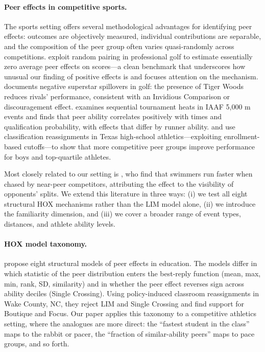 \documentclass[12pt]{article}
\theoremstyle{definition}
\theoremstyle{remark}
\begin{document}
\paragraph{Peer effects in competitive sports.}
The sports setting offers several methodological advantages for identifying peer
effects: outcomes are objectively measured, individual contributions are
separable, and the composition of the peer group often varies quasi-randomly across
competitions.
\citet{GuryanKroftNotowidigdo2009} exploit random pairing in professional golf to
estimate essentially zero average peer effects on scores---a clean benchmark that
underscores how unusual our finding of positive effects is and focuses attention
on the mechanism.
\citet{Brown2011} documents negative superstar spillovers in golf: the presence of
Tiger Woods reduces rivals' performance, consistent with an Invidious Comparison
or discouragement effect.
\citet{Hill2014} examines sequential tournament heats in IAAF 5{,}000 m events and
finds that peer ability correlates positively with times and qualification
probability, with effects that differ by runner ability.
\citet{Ashby2025} and \citet{AshbyRamos2023} use classification reassignments
in Texas high-school athletics---exploiting enrollment-based cutoffs---to show
that more competitive peer groups improve performance for boys and top-quartile
athletes.

Most closely related to our setting is \citet{YamaneHayashi2015},
who find that swimmers run faster when chased by near-peer competitors,
attributing the effect to the visibility of opponents' splits.
We extend this literature in three ways: (i) we test all eight structural HOX
mechanisms rather than the LIM model alone, (ii) we introduce the familiarity
dimension, and (iii) we cover a broader range of event types, distances, and
athlete ability levels.

\paragraph{HOX model taxonomy.}
\citet{HoxbyWeingarth2007} propose eight structural models of peer effects in
education.
The models differ in which statistic of the peer distribution enters the best-reply
function (mean, max, min, rank, SD, similarity) and in whether the peer effect
reverses sign across ability deciles (Single Crossing).
Using policy-induced classroom reassignments in Wake County, NC, they reject LIM
and Single Crossing and find support for Boutique and Focus.
Our paper applies this taxonomy to a competitive athletics setting, where the
analogues are more direct: the ``fastest student in the class'' maps to the rabbit
or pacer, the ``fraction of similar-ability peers'' maps to pace groups, and so forth.
\end{document}
